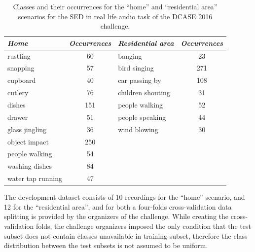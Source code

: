 
\begin{table}
	\caption{Classes and their occurrences for the ``home'' and ``residential area'' scenarios for the SED in real life audio task of the DCASE 2016 challenge.}
	\label{tab:classes}
	\centering
	\begin{tabular}{l c l c}\toprule
		\emph{Home} & \emph{Occurrences} & \emph{Residential area} & \emph{Occurrences}\\
		\midrule
		rustling & 60 & banging & 23\\
		snapping & 57 & bird singing & 271\\
		cupboard & 40 & car passing by & 108\\
		cutlery & 76 & children shouting & 31\\
		dishes & 151 & people walking & 52 \\
		drawer & 51 & people speaking & 44\\
		glass jingling & 36 & wind blowing & 30\\
		object impact & 250\\
		people walking & 54\\
		washing dishes & 84\\
		water tap running & 47\\
		\bottomrule
	\end{tabular}
\end{table}

The development dataset consists of 10 recordings for the ``home'' scenario, and 12 for the ``residential area'', and for both a four-folds cross-validation data splitting is provided by the organizers of the challenge. While creating the cross-validation folds, the challenge organizers imposed the only condition that the test subset does not contain classes unavailable in training subset, therefore the class distribution between the test subsets is not assumed to be uniform.

